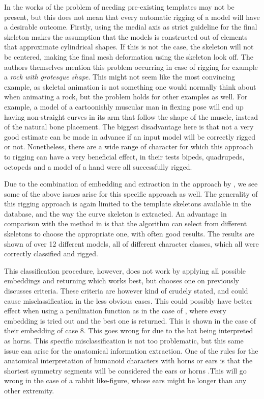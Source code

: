 \documentclass{article}
\begin{document}
In the works of \citep{paper2} the problem of needing pre-existing templates may
not be present, but this does not mean that every automatic rigging of a model will have a
desirable outcome. Firstly, using the medial axis as strict guideline for the
final skeleton makes the assumption that the models is constructed out of
elements that approximate cylindrical shapes. If this is not the case, the skeleton will not be centered,
making the final mesh deformation using the skeleton look off. The
authors themselves mention this problem occurring in case of rigging for example a \emph{rock
with grotesque shape}. This might not seem like the most convincing example, as
skeletal animation is not something one would normally think about when
animating a rock, but the problem holds for other examples as well. For example,
a model of a cartoonishly muscular man in flexing pose will end up having
non-straight curves in its arm that follow the shape of the muscle, instead of
the natural bone placement. The biggest disadvantage here is that not a very
good estimate can be made in advance if an input model will be correctly rigged
or not.
Nonetheless, there are a wide range of character for which this approach to
rigging can have a very beneficial effect, in their tests bipeds, quadrupeds,
octopeds and a model of a hand were all successfully rigged.

Due to the combination of embedding and extraction in the approach by \citep{paper3},
we see some of the above issues arise for this specific approach as well.
The generality of this rigging approach is again limited to the template
skeletons available in the database, and the way the curve skeleton is
extracted.
An advantage in comparison with the method in \citep{paper1} is that the
algorithm can select from different skeletons to choose the appropriate one,
with often good results. The results are shown of over 12 different models, all
of different character classes, which
all were correctly classified and rigged. 

This classification procedure, however, does not work by applying 
all possible embeddings and returning which works
best, but chooses one on previously discusses criteria. These criteria are
however kind of crudely stated, and could cause misclassification in the less
obvious cases. This could possibly have better effect when using a penilization
function as in the case of \citep{paper1}, where every embedding is tried out
and the best one is returned. This is shown in the case of their embedding of
case 8. This goes wrong for \citep{paper3} due to the hat being interpreted as
horns. This specific misclassification is not too problematic,
but this same issue can arise for the anatomical information
extraction. One of the rules for the anatomical interpretation of humanoid
characters with horns or ears is that the shortest symmetry segments will be
considered the ears or horns .This will go wrong in the case of a
rabbit like-figure, whose ears might be longer than any other extremity.
\end{document}
